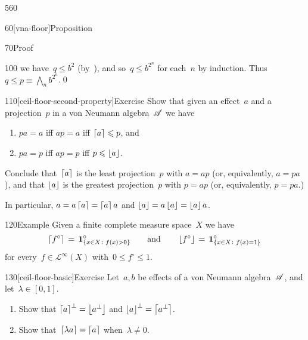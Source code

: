 \begin{parsec}{560}
\begin{point}{60}[vna-floor]{Proposition}
\begin{point}{70}{Proof}
\begin{point}{100}
we have~$q\leq b^2$ (by~),
and so~$q\leq b^{2^n}$ for each~$n$ by induction.
Thus~$q\leq p\equiv\bigwedge_n b^{2^n}$.\qed
\end{point}
\end{point}
\end{point}
\begin{point}{110}[ceil-floor-second-property]{Exercise}%
Show that given an effect~$a$ and a projection~$p$
in a von Neumann algebra~$\mathscr{A}$ we have
\begin{enumerate}
\item
$pa=a$ iff $ap=a$ iff $\left\lceil a\right\rceil\leqslant p$, and
\item
$pa=p$ iff $ap=p$ iff $p\leqslant \left\lfloor a\right\rfloor$.
\end{enumerate}
Conclude that~$\left\lceil a\right\rceil$
is the least projection~$p$ with $a=a p$
(or, equivalently, $a=pa$),
and that $\left\lfloor a\right\rfloor$
is the greatest projection~$p$ with $p=a p$
(or, equivalently, $p=pa$.)

In particular,
$a=a\left\lceil a\right\rceil=\left\lceil a\right\rceil a$
and $\left\lfloor a\right\rfloor=a\left\lfloor a\right\rfloor=\left\lfloor a\right\rfloor a$.
\end{point}
\begin{point}{120}{Example}%
Given a finite complete measure space~$X$
we have
\begin{equation*}
\left\lceil f^\circ\right\rceil
	\,=\,\mathbf{1}_{\{x\in X\colon f(x)>0\}}^\circ
	\qquad
	\text{and}\qquad
	\left\lfloor f^\circ\right\rfloor
	\,=\, \mathbf{1}_{\{x\in X\colon  f(x)=1\}}^\circ
\end{equation*}
for every~$f\in\mathcal{L}^\infty(X)$
with~$0\leq f^\circ \leq 1$.
\end{point}
\begin{point}{130}[ceil-floor-basic]{Exercise}%
Let~$a,b$ be effects of a von Neumann algebra~$\mathscr{A}$,
and let~$\lambda\in [0,1]$.
\begin{enumerate}
\item
Show that $\left\lceil a\right\rceil^\perp = \left\lfloor a^\perp\right\rfloor$
and $\left\lfloor a\right\rfloor^\perp = \left\lceil a^\perp\right\rceil$.
\item
Show that~$\left\lceil\lambda a\right\rceil = \left\lceil a\right\rceil$
when~$\lambda\neq 0$.


\end{enumerate}
\end{point}
\end{parsec}
